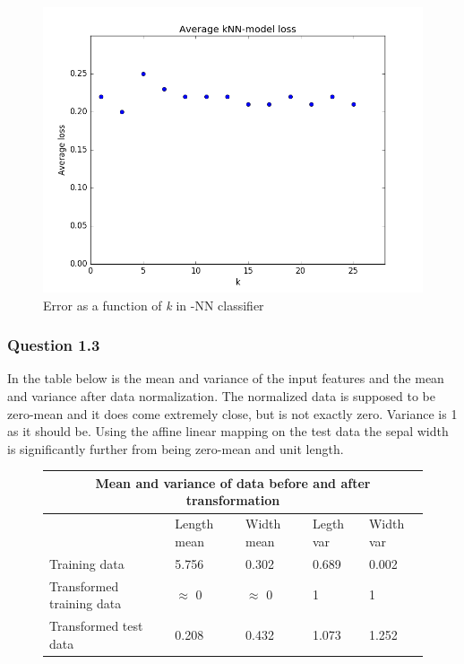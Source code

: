 \documentclass{article}
\begin{document}
\begin{figure}[h]
  \centering
\includegraphics[scale=0.5]{figure_1}
\caption{Error as a function of \textit{k} in -NN classifier}
\label{fig:figure1}
\end{figure}

\newpage
\subsubsection*{Question 1.3}
In the table below is the mean and variance of the input features and the mean
and variance after data normalization. The normalized data is supposed to be
zero-mean and it does come extremely close, but is not exactly zero. Variance is
1 as it should be. Using the affine linear mapping on the test data the sepal
width is significantly further from being zero-mean and unit length.

\begin{figure}[h]
\centering
\begin{tabular}{ |p{4cm}|p{1.5cm}|p{1.5cm}|p{1.5cm}|p{1.5cm}|  }
 \hline
 \multicolumn{5}{|c|}{Mean and variance of data before and after transformation}\\
 \hline
& Length mean & Width mean & Legth var & Width var \\
 \hline
 Training data              & 5.756 & 0.302 & 0.689 & 0.002 \\
 Transformed training data  & \(\approx\) 0  & \(\approx\) 0 & 1 & 1  \\
 Transformed test data      & 0.208 & 0.432 & 1.073 & 1.252 \\
 \hline
\end{tabular}
\end{figure}
\end{document}
